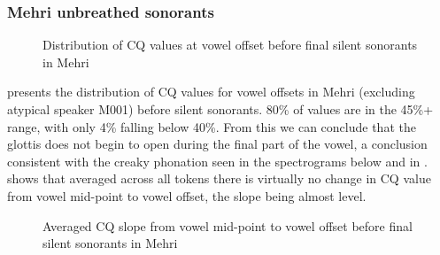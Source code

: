 \documentclass[output=paper]{langscibook}
\begin{document}
\subsubsection{Mehri unbreathed sonorants} %
\begin{figure}[b]
\caption{Distribution of CQ values at vowel offset before final silent sonorants in Mehri}
\label{fig:watson:15}
\end{figure}

\label{sec:watson:4.4.2}
 presents the distribution of CQ values for vowel offsets in Mehri (excluding atypical speaker M001) before silent sonorants. 80\% of values are in the 45\%+ range, with only 4\% falling below 40\%. From this we can conclude that the glottis does not begin to open during the final part of the vowel, a conclusion consistent with the creaky phonation seen in the spectrograms below and in .  shows that averaged across all tokens there is virtually no change in CQ value from vowel mid-point to vowel offset, the slope being almost level.


  
\begin{figure}
\caption{Averaged CQ slope from vowel mid-point to vowel offset before final silent sonorants in Mehri}
\label{fig:watson:16}
\end{figure}
\end{document}
